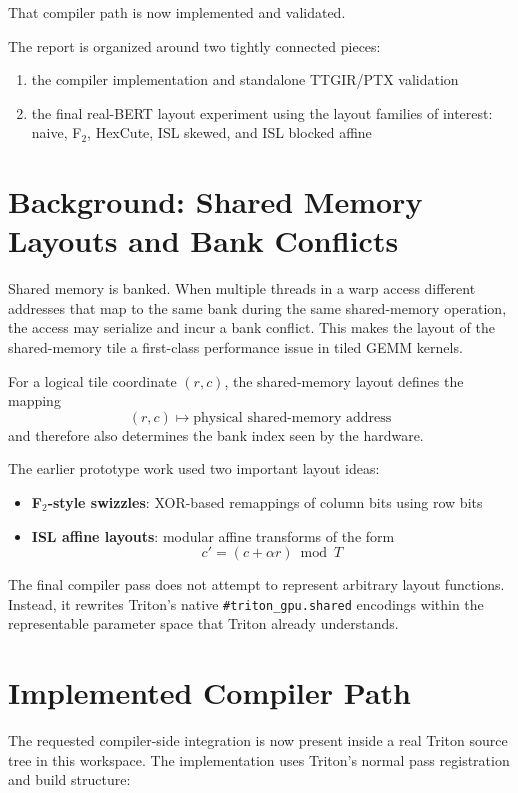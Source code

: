 \documentclass[11pt,a4paper]{article}
\begin{document}
That compiler path is now implemented and validated.

The report is organized around two tightly connected pieces:

\begin{enumerate}
\item the compiler implementation and standalone TTGIR/PTX validation
\item the final real-BERT layout experiment using the layout families of
      interest: naive, F$_2$, HexCute, ISL skewed, and ISL blocked affine
\end{enumerate}

\section{Background: Shared Memory Layouts and Bank Conflicts}

Shared memory is banked.  When multiple threads in a warp access different
addresses that map to the same bank during the same shared-memory operation,
the access may serialize and incur a bank conflict.  This makes the layout of
the shared-memory tile a first-class performance issue in tiled GEMM kernels.

For a logical tile coordinate $(r, c)$, the shared-memory layout defines the
mapping
\[
(r, c) \mapsto \text{physical shared-memory address}
\]
and therefore also determines the bank index seen by the hardware.

The earlier prototype work used two important layout ideas:

\begin{itemize}
\item \textbf{F$_2$-style swizzles}: XOR-based remappings of column bits using
      row bits
\item \textbf{ISL affine layouts}: modular affine transforms of the form
      \[
      c' = (c + \alpha r) \bmod T
      \]
\end{itemize}

The final compiler pass does not attempt to represent arbitrary layout
functions.  Instead, it rewrites Triton's native
\texttt{\#triton\_gpu.shared} encodings within the representable parameter
space that Triton already understands.

\section{Implemented Compiler Path}

The requested compiler-side integration is now present inside a real Triton
source tree in this workspace.  The implementation uses Triton's normal pass
registration and build structure:
\end{document}
